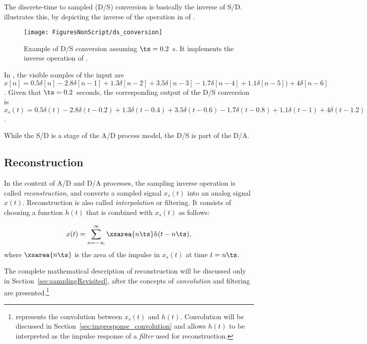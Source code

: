 The discrete-time to sampled (D/S) conversion is basically the inverse of S/D. 
 illustrates this, by depicting the inverse of the operation in  of . 
\begin{figure}
	\centering
		\texttt{[image: FiguresNonScript/ds\_conversion]}
	\caption{Example of D/S conversion assuming $\ts=0.2$~s. It implements the inverse operation of .\label{fig:ds_conversion}}
\end{figure}

In , the visible samples of the input are
$x[n] = 0.5\delta[n] -2.8\delta[n-1] + 1.3\delta[n-2]+ 3.5\delta[n-3] -1.7\delta[n-4] + 1.1\delta[n-5]) + 4\delta[n-6]$.
Given that $\ts = 0.2$~seconds, the corresponding output of the D/S conversion is $x_s(t) = 0.5\delta(t) -2.8\delta(t-0.2) + 1.3\delta(t-0.4)+ 3.5\delta(t-0.6) -1.7\delta(t-0.8) + 1.1\delta(t-1) + 4\delta(t-1.2)$.

While the S/D is a stage of the A/D process model, the D/S is part of the D/A.

\subsection{Reconstruction}
\label{sec:reconstruction}

In the context of A/D and D/A processes, the sampling inverse operation
is called \emph{reconstruction}, and converts a sampled signal $x_s(t)$ into an analog signal $x(t)$. Reconstruction is also called \emph{interpolation} or filtering. It consists of choosing a function $h(t)$ that is combined with $x_s(t)$ as follows:

\begin{equation}
x(t) = \sum_{n=-\infty}^{\infty} \xsarea{{n \ts}} h(t - n \ts),
\label{eq:reconstruction1}
\end{equation}
where $\xsarea{{n \ts}}$ is the area of the impulse in $x_s(t)$ at time $t=n \ts$.

The complete mathematical description of reconstruction will be discussed only in Section~\ref{sec:samplingRevisited}, after the concepts of \emph{convolution} and filtering are presented.\footnote{ represents the convolution between $x_s(t)$ and $h(t)$. Convolution will be discussed in Section~\ref{sec:impresponse_convolution} and allows $h(t)$ to be interpreted as the impulse response of a \emph{filter} used for reconstruction.} 

